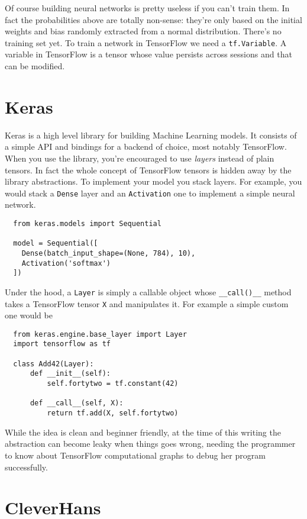 Of course building neural networks is pretty useless if you can't train
them. In fact the probabilities above are totally non-sense: they're
only based on the initial weights and bias randomly extracted from a
normal distribution. There's no training set yet. To train a network in
TensorFlow we need a \texttt{tf.Variable}. A variable in TensorFlow is
a tensor whose value persists across sessions and that can be modified.

\section{Keras}
\label{sec:keras}

Keras is a high level library for building Machine Learning models. It consists
of a simple API and bindings for a backend of choice, most notably TensorFlow.
When you use the library, you're encouraged to use \emph{layers} instead of
plain tensors. In fact the whole concept of TensorFlow tensors is hidden away by
the library abstractions. To implement your model you stack layers. For example,
you would stack a \texttt{Dense} layer and an \texttt{Activation} one to
implement a simple neural network.

\begin{verbatim}
  from keras.models import Sequential

  model = Sequential([
    Dense(batch_input_shape=(None, 784), 10),
    Activation('softmax')
  ])
\end{verbatim}

Under the hood, a \texttt{Layer} is simply a callable object whose
\texttt{\_\_call()\_\_} method takes a TensorFlow tensor \texttt{X} and
manipulates it. For example a simple custom one would be
\begin{verbatim}
  from keras.engine.base_layer import Layer
  import tensorflow as tf

  class Add42(Layer):
      def __init__(self):
          self.fortytwo = tf.constant(42)

      def __call__(self, X):
          return tf.add(X, self.fortytwo)
\end{verbatim}

While the idea is clean and beginner friendly, at the time of this writing the
abstraction can become leaky when things goes wrong, needing the programmer to know
about TensorFlow computational graphs to debug her program successfully.

\section{CleverHans}
\label{sec:cleverhans}

